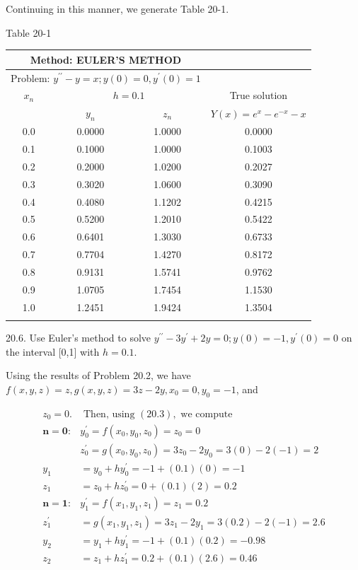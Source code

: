 \documentclass[10pt]{article}
\begin{document}
Continuing in this manner, we generate Table 20-1.

Table 20-1

\begin{center}
\begin{tabular}{|c|c|c|c|}
\hline
\multicolumn{3}{|c|}{Method: EULER'S METHOD} &  \\
\hline
\multicolumn{3}{|c|}{Problem: $y^{\prime \prime}-y=x ; y(0)=0, y^{\prime}(0)=1$} &  \\
\hline
$x_{n}$ & \multicolumn{2}{|c|}{$h=0.1$} & \multicolumn{1}{c|}{True solution} \\
\cline { 2 - 4 }
 & $y_{n}$ & $z_{n}$ & $Y(x)=e^{x}-e^{-x}-x$ \\
\hline
0.0 & 0.0000 & 1.0000 & 0.0000 \\
\hline
0.1 & 0.1000 & 1.0000 & 0.1003 \\
\hline
0.2 & 0.2000 & 1.0200 & 0.2027 \\
\hline
0.3 & 0.3020 & 1.0600 & 0.3090 \\
\hline
0.4 & 0.4080 & 1.1202 & 0.4215 \\
\hline
0.5 & 0.5200 & 1.2010 & 0.5422 \\
\hline
0.6 & 0.6401 & 1.3030 & 0.6733 \\
\hline
0.7 & 0.7704 & 1.4270 & 0.8172 \\
\hline
0.8 & 0.9131 & 1.5741 & 0.9762 \\
\hline
0.9 & 1.0705 & 1.7454 & 1.1530 \\
\hline
1.0 & 1.2451 & 1.9424 & 1.3504 \\
\hline
 &  &  &  \\
\hline
\end{tabular}
\end{center}

20.6. Use Euler's method to solve $y^{\prime \prime}-3 y^{\prime}+2 y=0 ; y(0)=-1, y^{\prime}(0)=0$ on the interval [0,1] with $h=0.1$.

Using the results of Problem 20.2, we have $f(x, y, z)=z, g(x, y, z)=3 z-2 y, x_{0}=0, y_{0}=-1$, and

$$
\begin{aligned}
z_{0}=0 . & \text { Then, using }(20.3), \text { we compute } \\
\boldsymbol{n}=\mathbf{0}: & y_{0}^{\prime}=f\left(x_{0}, y_{0}, z_{0}\right)=z_{0}=0 \\
& z_{0}^{\prime}=g\left(x_{0}, y_{0}, z_{0}\right)=3 z_{0}-2 y_{0}=3(0)-2(-1)=2 \\
y_{1} & =y_{0}+h y_{0}^{\prime}=-1+(0.1)(0)=-1 \\
z_{1} & =z_{0}+h z_{0}^{\prime}=0+(0.1)(2)=0.2 \\
\boldsymbol{n}=\mathbf{1}: & y_{1}^{\prime}=f\left(x_{1}, y_{1}, z_{1}\right)=z_{1}=0.2 \\
z_{1}^{\prime} & =g\left(x_{1}, y_{1}, z_{1}\right)=3 z_{1}-2 y_{1}=3(0.2)-2(-1)=2.6 \\
y_{2} & =y_{1}+h y_{1}^{\prime}=-1+(0.1)(0.2)=-0.98 \\
z_{2} & =z_{1}+h z_{1}^{\prime}=0.2+(0.1)(2.6)=0.46
\end{aligned}
$$
\end{document}
